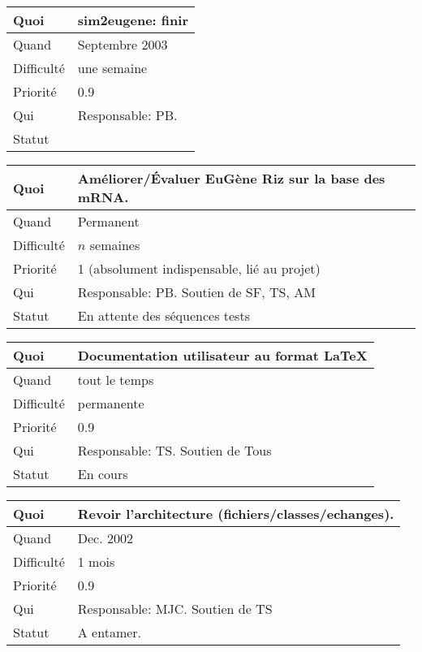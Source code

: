 \documentclass[a4paper,11pt]{article}
\begin{document}
\begin{longtable}{|l|p{7cm}|}\hline
  Quoi & sim2eugene: finir\\\hline
  Quand  &  Septembre 2003\\\hline
  Difficult\'e &  une semaine \\\hline
  Priorit\'e &  0.9\\\hline
  Qui & Responsable: PB.\\\hline
  Statut & \\\hline
\end{longtable}

\begin{longtable}{|l|p{7cm}|}\hline
  Quoi & Am\'eliorer/\'Evaluer EuG\`ene Riz sur la base des mRNA.\\\hline
  Quand  & Permanent\\\hline
  Difficult\'e & $n$ semaines \\\hline
  Priorit\'e & 1 (absolument indispensable, li\'e au projet) \\\hline
  Qui & Responsable: PB. Soutien de SF, TS, AM\\\hline
  Statut & En attente des s\'equences tests\\\hline
\end{longtable}

\begin{longtable}{|l|p{7cm}|}\hline
  Quoi & Documentation utilisateur au format LaTeX\\\hline
  Quand  &  tout le temps\\\hline
  Difficult\'e &  permanente\\\hline
  Priorit\'e &  0.9 \\\hline
  Qui & Responsable: TS. Soutien de Tous\\\hline
  Statut & En cours\\\hline
\end{longtable}

\begin{longtable}{|l|p{7cm}|}\hline
  Quoi & Revoir l'architecture (fichiers/classes/echanges).\\\hline
  Quand  &  Dec. 2002\\\hline
  Difficult\'e &  1 mois\\\hline
  Priorit\'e &  0.9 \\\hline
  Qui & Responsable: MJC. Soutien de TS\\\hline
  Statut & A entamer. \\\hline
\end{longtable}
\end{document}
